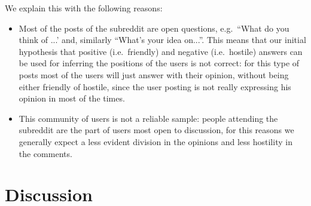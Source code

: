 We explain this with the following reasons:
\begin{itemize}
	\item Most of the posts of the subreddit are open questions, e.g.\ ``What
	      do you think of ...' and, similarly ``What's your idea on...''. This
	      means that our initial hypothesis that positive (i.e.\ friendly) and negative
	      (i.e.\ hostile) answers can be used for inferring the positions of
	      the users is not correct: for this type of posts most of the users
	      will just answer with their opinion, without being either friendly of
	      hostile, since the user posting is not really expressing his opinion
	      in most of the times.
	\item This community of users is not a reliable sample: people attending
	      the subreddit are the part of users most open to discussion, for this
	      reasons we generally expect a less evident division in the opinions and
	      less hostility in the comments.
\end{itemize}



\section{Discussion}%
\label{sec:discussion}
